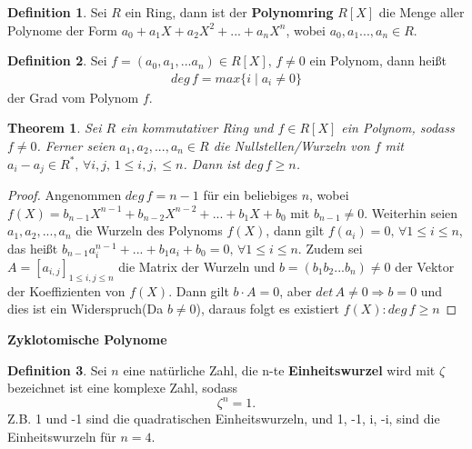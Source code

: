\documentclass[12pt,oneside]{article}
\newtheorem{theorem}{Theorem}[section]
\theoremstyle{remark}
\theoremstyle{definition}
\newtheorem{definition}{Definition}[section]
\begin{document}
\begin{definition}
Sei $R$ ein Ring, dann ist der \textbf{Polynomring} $R[X]$ die Menge aller Polynome der Form $a_{0} + a_{1}X + a_{2} X^2 + ... + a_{n}X^n$, wobei $a_{0},a_{1}...,a_{n} \in R$.
\end{definition}

\smallskip

\begin{definition}
Sei $f = (a_0, a_1,...a_n) \in R[X], \, f \neq 0 $ ein Polynom, dann heißt
\begin{align*}
    deg \, f = max \{ i  \mid a_i \neq 0 \}
\end{align*}
der Grad vom Polynom $f$.  
\end{definition}

\smallskip

\begin{theorem}\label{number_of_roots}
Sei $R$ ein kommutativer Ring und $f \in R[X]$ ein Polynom, sodass $f \neq 0$. Ferner seien $a_1, a_2,...,a_n \in R$ die Nullstellen/Wurzeln von $f$ mit $a_i - a_j \in R^*, \, \forall i,j, \, 1 \leq i,j, \leq n$. Dann ist $deg \, f \geq n$.
\end{theorem}

\begin{proof}
Angenommen $deg \, f = n - 1$ für ein beliebiges $n$, wobei $f(X) = b_{n-1}X^{n-1} + b_{n-2}X^{n-2} + ... + b_1 X + b_0$ mit $b_{n-1} \neq 0$. Weiterhin seien $a_1,a_2,...,a_{n}$ die Wurzeln des Polynoms $f(X)$, dann gilt $f(a_i) = 0, \, \forall 1 \leq i \leq n$, das heißt $b_{n-1} a_i^{n-1} +...+ b_1 a_i + b_0 = 0, \, \forall 1 \leq i \leq n$. \newline\newline Zudem sei $A = [a_{i,j}]_{1 \leq i,j \leq n}$ die Matrix der Wurzeln und $b = (b_1 b_2 ...b_{n}) \neq 0$ der Vektor der Koeffizienten von $f(X)$. Dann gilt $b \cdot A = 0$, aber $det \, A \neq 0 \Rightarrow  b = 0$ und dies ist ein Widerspruch(Da $b \neq 0$), daraus folgt es existiert $f(X) : deg \, f \geq n$  
\end{proof}

\smallskip

\textbf{Zyklotomische Polynome}

\begin{definition}
Sei $n$ eine natürliche Zahl, die n-te \textbf{Einheitswurzel} wird mit $\zeta$ bezeichnet ist eine komplexe Zahl, sodass
\begin{equation}
    \zeta^n = 1.
\end{equation}
Z.B. 1 und -1 sind die quadratischen Einheitswurzeln, und 1, -1, i, -i, sind die Einheitswurzeln für $n = 4$.    
\end{definition}
\end{document}
